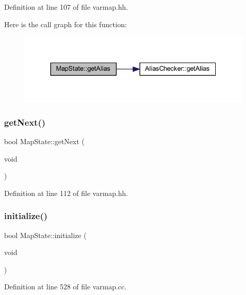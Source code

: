 Definition at line 107 of file varmap.\+hh.

Here is the call graph for this function\+:
\nopagebreak
\begin{figure}[H]
\begin{center}
\leavevmode
\includegraphics[width=332pt]{class_map_state_ac012c72e8f7813346c8d74ce76f3faf0_cgraph}
\end{center}
\end{figure}
\mbox{\label{class_map_state_a94ebfd56a48cd7ce01899a4726c619c7}} 
\subsubsection{\texorpdfstring{getNext()}{getNext()}}
{\footnotesize\ttfamily bool Map\+State\+::get\+Next (\begin{DoxyParamCaption}\item[{void}]{ }\end{DoxyParamCaption})\hspace{0.3cm}{\ttfamily [inline]}}



Definition at line 112 of file varmap.\+hh.

\mbox{\label{class_map_state_a517ee785ba7b8b397e76b75d8e085bae}} 
\subsubsection{\texorpdfstring{initialize()}{initialize()}}
{\footnotesize\ttfamily bool Map\+State\+::initialize (\begin{DoxyParamCaption}\item[{void}]{ }\end{DoxyParamCaption})}



Definition at line 528 of file varmap.\+cc.

